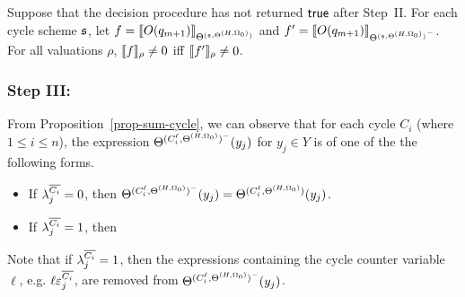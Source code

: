 \begin{lemma}\label{prop-bnd-domain-1}
	Suppose that the decision procedure has not returned $\mathsf{true}$ after Step~II. For each cycle scheme ${\mathfrak{s} }$, let $f=\llbracket O(q_{m+1})\rrbracket_{\Theta^{({\mathfrak{s} }, \Theta^{(H,\Omega_0)})}}$ and $f'=\llbracket O(q_{m+1})\rrbracket_{{\Theta^{({\mathfrak{s} }, \Theta^{(H,\Omega_0)})}}^-}$. For all valuations $\rho$, $\llbracket f\rrbracket_{\rho}\neq 0$ iff $\llbracket f'\rrbracket_{\rho} \neq 0$.
\end{lemma}



\subsubsection{Step III:} 

From Proposition~\ref{prop-sum-cycle},  we can observe that for each cycle $C_i$ (where $1 \le i \le n$),  the expression $\Theta^{(C^\ell_i, \Theta^{(H,\Omega_0)})^-}(y_j)$ for $y_j \in Y$ is of one of the the following forms.
\begin{itemize}
\item If $\lambda^{\overline{C_i}}_{j}=0$, then $\Theta^{(C^\ell_i, \Theta^{(H,\Omega_0)})^{-}}(y_j) = \Theta^{(C^\ell_i, \Theta^{(H,\Omega_0)})}(y_j)$.

\item If $\lambda^{\overline{C_i}}_{j}=1$, then
\medskip\\
\end{itemize}
Note that if $\lambda^{\overline{C_i}}_{j}=1$, then the expressions containing the cycle counter variable $\ell$, e.g. $\ell \varepsilon^{\overline{C_i}}_j$, are removed from $\Theta^{(C^\ell_i, \Theta^{(H,\Omega_0)})^-}(y_j)$.

